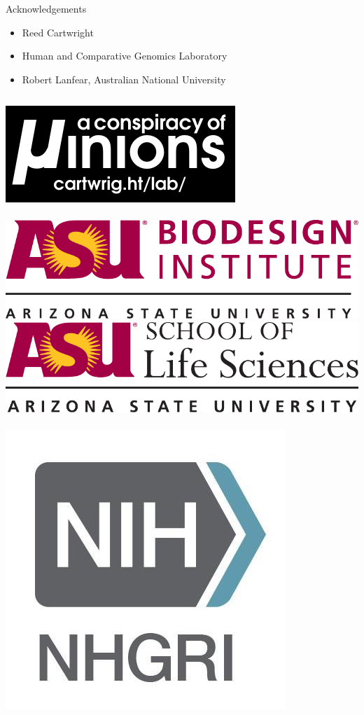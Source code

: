 \documentclass{beamer}
\begin{document}
\begin{frame}{Acknowledgements}
\begin{itemize}
\item Reed Cartwright
\item Human and Comparative Genomics Laboratory
\item Robert Lanfear, Australian National University
\end{itemize}

\begin{columns}
	\includegraphics[width=.9\linewidth]{lab_logo.pdf}
	\\~\\
	\includegraphics[width=.9\linewidth]{biodesign_logo.pdf}
	\includegraphics[width=.9\linewidth]{sols_logo.pdf}
	\\~\\
	\includegraphics[width=.9\linewidth]{nih-nhgri-official-logo.jpg}
\end{columns}


\end{frame}
\end{document}
